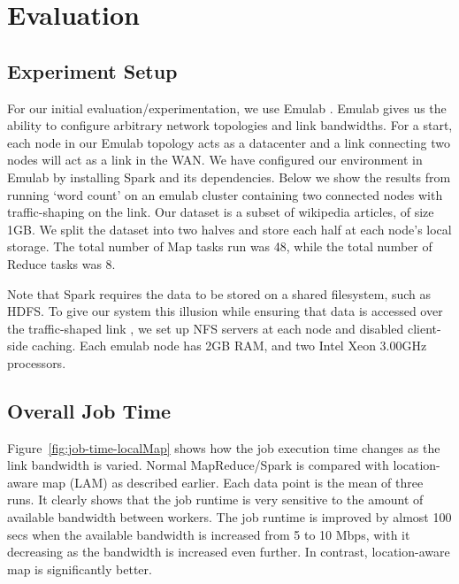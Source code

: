 \section{Evaluation}

\subsection{Experiment Setup}
For our initial evaluation/experimentation, we use Emulab \cite{emulab}. Emulab gives us the ability to configure arbitrary network topologies and link bandwidths. For a start, each node in our Emulab topology acts as a datacenter and a link connecting two nodes will act as a link in the WAN. We have configured our environment in Emulab by installing Spark and its dependencies.  Below we show the results from running `word count' on an emulab cluster containing two connected nodes with traffic-shaping on the link. Our dataset is a subset of wikipedia articles, of size 1GB. We split the dataset into two halves and store each half at each node's local storage. The total number of Map tasks run was 48, while the total number of Reduce tasks was 8. 

Note that Spark requires the data to be stored on a shared filesystem, such as HDFS. To give our system this illusion while ensuring that data is accessed over the traffic-shaped link , we set up NFS servers at each node and disabled client-side caching. Each emulab node has 2GB RAM, and two Intel Xeon 3.00GHz processors.

\subsection{Overall Job Time}
Figure~\ref{fig:job-time-localMap} shows how the job execution time changes as the link bandwidth is varied. %
Normal MapReduce/Spark is compared with location-aware map (LAM) as described earlier. 
Each data point is the mean of three runs. It clearly shows that the job runtime is very sensitive to the amount of available bandwidth between workers. The job runtime is improved by almost 100 secs when the available bandwidth is increased from 5 to 10 Mbps, with it decreasing as the bandwidth is increased even further.  
In contrast, location-aware map is significantly better.

